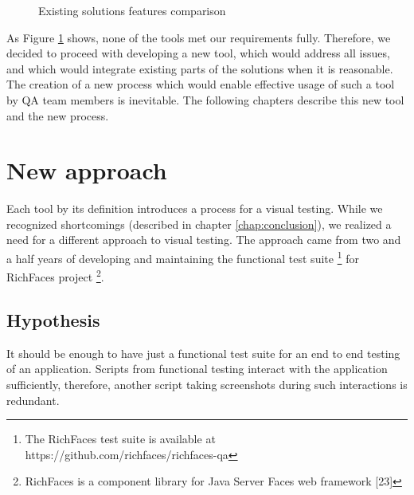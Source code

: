\documentclass[11pt,oneside,final]{fithesis2}
\begin{document}
  \begin{figure}[!htb]
    \begin{center}
    \leavevmode
    \centerline{}
    \end{center}
    \caption{Existing solutions features comparison}
    \label{fig:existingSolutionComparison} 
  \end{figure}
  
  As Figure \ref{fig:existingSolutionComparison} shows, none of the tools met our requirements fully. Therefore, we decided to proceed with developing a new tool, which would address
  all issues, and which would integrate existing parts of the solutions when it is reasonable. The creation of a new process which would enable effective usage of such a
  tool by QA team members is inevitable. The following chapters describe this new tool and the new process.
  
\chapter{New approach}
  Each tool by its definition introduces a process for a visual testing. While we recognized shortcomings (described in chapter \ref{chap:conclusion}), we realized a need for a different 
  approach to visual testing. The approach came from two and a half years of developing and maintaining the functional test suite \footnote{The RichFaces test suite is available at 
  https://github.com/richfaces/richfaces-qa} for RichFaces project \footnote{RichFaces is a component library for Java Server Faces web framework [23]}.
  
  \section{Hypothesis}
  \label{sec:hypothesis}
  It should be enough to have just a functional test suite for an end to end testing of an application. Scripts from functional testing interact with the application sufficiently, 
  therefore, another script taking screenshots during such interactions is redundant.
  
\end{document}
